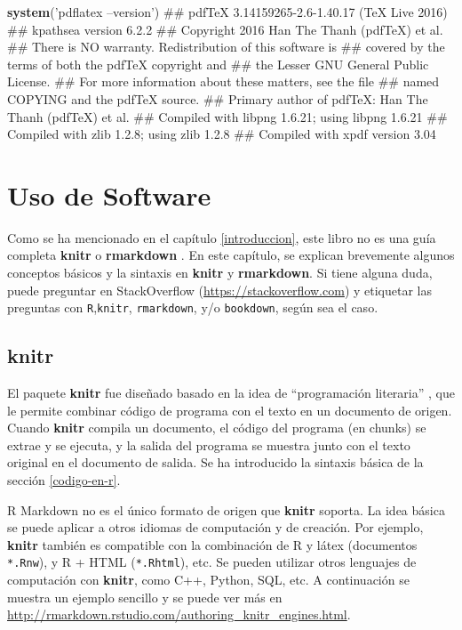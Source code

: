 \documentclass[12pt,]{krantz}
\makeatletter
\newenvironment{Shaded}{\begin{snugshade}}{\end{snugshade}}
\newcommand{\KeywordTok}[1]{\textcolor[rgb]{0.13,0.29,0.53}{\textbf{#1}}}
\newcommand{\StringTok}[1]{\textcolor[rgb]{0.31,0.60,0.02}{#1}}
\newcommand{\NormalTok}[1]{#1}
\newenvironment{kframe}{%
\medskip{}
\setlength{\fboxsep}{.8em}
 \def\at@end@of@kframe{}%
 \ifinner\ifhmode%
  \def\at@end@of@kframe{\end{minipage}}%
  \begin{minipage}{\columnwidth}%
 \fi\fi%
 \def\FrameCommand##1{\hskip\@totalleftmargin \hskip-\fboxsep
 \colorbox{shadecolor}{##1}\hskip-\fboxsep
     \hskip-\linewidth \hskip-\@totalleftmargin \hskip\columnwidth}%
 \MakeFramed {\advance\hsize-\width
   \@totalleftmargin\z@ \linewidth\hsize
   \@setminipage}}%
 {\par\unskip\endMakeFramed%
 \at@end@of@kframe}
\renewenvironment{Shaded}{\begin{kframe}}{\end{kframe}}
\theoremstyle{definition}
\theoremstyle{definition}
\theoremstyle{definition}
\theoremstyle{remark}
\makeatother
\begin{document}
\begin{Shaded}
\begin{Highlighting}[]
\KeywordTok{system}\NormalTok{(}\StringTok{'pdflatex --version'}\NormalTok{)}
\NormalTok{## pdfTeX 3.14159265-2.6-1.40.17 (TeX Live 2016)}
\NormalTok{## kpathsea version 6.2.2}
\NormalTok{## Copyright 2016 Han The Thanh (pdfTeX) et al.}
\NormalTok{## There is NO warranty.  Redistribution of this software is}
\NormalTok{## covered by the terms of both the pdfTeX copyright and}
\NormalTok{## the Lesser GNU General Public License.}
\NormalTok{## For more information about these matters, see the file}
\NormalTok{## named COPYING and the pdfTeX source.}
\NormalTok{## Primary author of pdfTeX: Han The Thanh (pdfTeX) et al.}
\NormalTok{## Compiled with libpng 1.6.21; using libpng 1.6.21}
\NormalTok{## Compiled with zlib 1.2.8; using zlib 1.2.8}
\NormalTok{## Compiled with xpdf version 3.04}
\end{Highlighting}
\end{Shaded}

\chapter{Uso de Software}\label{uso-de-software}

Como se ha mencionado en el capítulo \ref{introduccion}, este libro no
es una guía completa \textbf{knitr} o \textbf{rmarkdown }. En este
capítulo, se explican brevemente algunos conceptos básicos y la sintaxis
en \textbf{knitr} y \textbf{rmarkdown}. Si tiene alguna duda, puede
preguntar en StackOverflow (\url{https://stackoverflow.com}) y etiquetar
las preguntas con \texttt{R},\texttt{knitr}, \texttt{rmarkdown}, y/o
\texttt{bookdown}, según sea el caso.

\section{knitr}\label{knitr}

El paquete \textbf{knitr} fue diseñado basado en la idea de
``programación literaria'' \citep{knuth1984}, que le permite combinar
código de programa con el texto en un documento de origen. Cuando
\textbf{knitr} compila un documento, el código del programa (en chunks)
se extrae y se ejecuta, y la salida del programa se muestra junto con el
texto original en el documento de salida. Se ha introducido la sintaxis
básica de la sección \ref{codigo-en-r}.

R Markdown no es el único formato de origen que \textbf{knitr} soporta.
La idea básica se puede aplicar a otros idiomas de computación y de
creación. Por ejemplo, \textbf{knitr} también es compatible con la
combinación de R y látex (documentos \texttt{*.Rnw}), y R + HTML
(\texttt{*.Rhtml}), etc. Se pueden utilizar otros lenguajes de
computación con \textbf{knitr}, como C++, Python, SQL, etc. A
continuación se muestra un ejemplo sencillo y se puede ver más en
\url{http://rmarkdown.rstudio.com/authoring_knitr_engines.html}.
\end{document}
